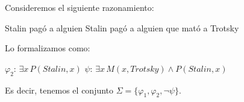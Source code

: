 \begin{example}
Consideremos el siguiente razonamiento:
\begin{center}
{Stalin pagó a alguien} 
{Stalin pagó a alguien que mató a Trotsky}
\end{center}

Lo formalizamos como:
\begin{center}
{$\varphi_2$: $\exists x \, P(Stalin, x)$}
{$\psi$: $\exists x \,  M(x, Trotsky) \land P(Stalin, x)$}
\end{center}

Es decir, tenemos el conjunto $\Sigma = \{\varphi_1, \varphi_2, \neg \psi \}$.

\begin{center}

\end{center}
\end{example}
